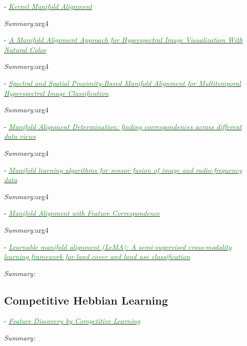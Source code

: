 \documentclass[]{article}
\newcommand{\paperentry}[4]{
            \hangindent=1cm
            \cite{#1} - \href{run:../References/#3}{\textcolor{ForestGreen}{\textit{#2}}}
            
            \noindent            
            \begin{minipage}[t]{0.1\linewidth}\hfill\end{minipage}
            \begin{minipage}[t]{0.8\linewidth}\textcolor{NavyBlue}{{\textit{Summary:}}}#4\end{minipage}
            \vspace{.25cm}
          }
\begin{document}
		\paperentry{Tuia2015KernelManifoldAlignment}
		{Kernel Manifold Alignment}
		{Manifold_Representation_Learning/Alignment/Tuia2015KernelManifoldAlignment.pdf}
		{arg4}
		
		\paperentry{Liao2016ManAlignmentHSI}
		{A Manifold Alignment Approach for Hyperspectral Image Visualization With Natural Color}
		{Manifold_Representation_Learning/Alignment/Liao2016ManAlignmentHSI.pdf}
		{arg4}
		
		\paperentry{Yang2016ManifoldAlignmentMultitemporalHSI}
		{Spectral and Spatial Proximity-Based Manifold Alignment for Multitemporal Hyperspectral Image Classification}
		{Manifold_Representation_Learning/Alignment/Yang2016ManifoldAlignmentMultitemporalHSI.pdf}
		{arg4}
		
		\paperentry{Damianou2017ManifoldAlignmentDifferentDataView}
		{Manifold Alignment Determination: finding correspondences across different data views}
		{Manifold_Representation_Learning/Alignment/Damianou2017ManifoldAlignmentDifferentDataView.pdf}
		{arg4}
		
		\paperentry{Shen2018ManifoldSensorFusionImageData}
		{Manifold learning algorithms for sensor fusion of image and radio-frequency data}
		{Manifold_Representation_Learning/Alignment/Shen2018ManifoldSensorFusionImageData.pdf}
		{arg4}
		
		\paperentry{Stanley2019ManAlignmentFeatureCorrespondence}
		{Manifold Alignment with Feature Correspondence}
		{Manifold_Representation_Learning/Alignment/Stanley2019ManAlignmentFeatureCorrespondence.pdf}
		{arg4}
		
		\paperentry{Hong2019LearnableManifoldAlignment}
		{Learnable manifold alignment (LeMA): A semi-supervised cross-modality learning framework for land cover and land use classification}
		{Manifold_Representation_Learning/Alignment/Hong2019LearnableManifoldAlignment.pdf}
		{}
	
	
	\subsection{Competitive Hebbian Learning}
	
	\paperentry
	{Rumelhart1985CHL}
	{Feature Discovery by Competitive Learning}
	{Manifold_Representation_Learning/CHL/Rumelhart1985CHL.pdf}
	{}
	
\end{document}
